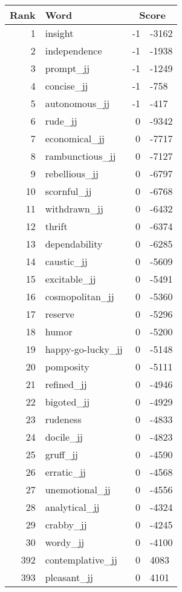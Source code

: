 \begin{longtable}[!htbp]{| rlr@{.}l |}
    \hline
    \textbf{Rank} & \textbf{Word} & \multicolumn{2}{c|}{\textbf{Score}} \\
    \hline
    \endhead
    1 & insight & -1 & -3162 \\
    2 & independence & -1 & -1938 \\
    3 & prompt\_jj & -1 & -1249 \\
    4 & concise\_jj & -1 & -758 \\
    5 & autonomous\_jj & -1 & -417 \\
    6 & rude\_jj & 0 & -9342 \\
    7 & economical\_jj & 0 & -7717 \\
    8 & rambunctious\_jj & 0 & -7127 \\
    9 & rebellious\_jj & 0 & -6797 \\
    10 & scornful\_jj & 0 & -6768 \\
    11 & withdrawn\_jj & 0 & -6432 \\
    12 & thrift & 0 & -6374 \\
    13 & dependability & 0 & -6285 \\
    14 & caustic\_jj & 0 & -5609 \\
    15 & excitable\_jj & 0 & -5491 \\
    16 & cosmopolitan\_jj & 0 & -5360 \\
    17 & reserve & 0 & -5296 \\
    18 & humor & 0 & -5200 \\
    19 & happy-go-lucky\_jj & 0 & -5148 \\
    20 & pomposity & 0 & -5111 \\
    21 & refined\_jj & 0 & -4946 \\
    22 & bigoted\_jj & 0 & -4929 \\
    23 & rudeness & 0 & -4833 \\
    24 & docile\_jj & 0 & -4823 \\
    25 & gruff\_jj & 0 & -4590 \\
    26 & erratic\_jj & 0 & -4568 \\
    27 & unemotional\_jj & 0 & -4556 \\
    28 & analytical\_jj & 0 & -4324 \\
    29 & crabby\_jj & 0 & -4245 \\
    30 & wordy\_jj & 0 & -4100 \\
    392 & contemplative\_jj & 0 & 4083 \\
    393 & pleasant\_jj & 0 & 4101 \\

\end{longtable}
